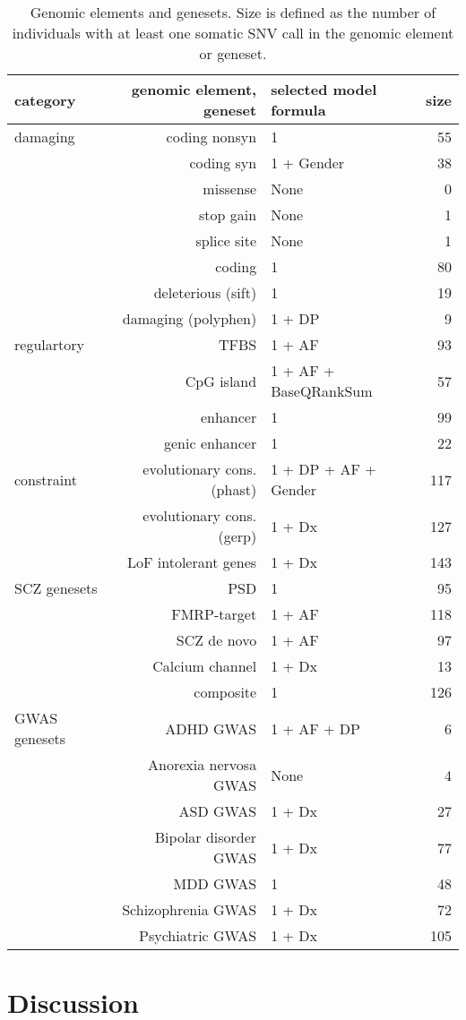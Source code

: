\documentclass[letterpaper]{article}
\begin{document}
\begin{table}
\begin{tabular}{lrlr}
category & genomic element, geneset & selected model formula & size \\
\hline
\hline
damaging & coding nonsyn & 1 & 55 \\
& coding syn & 1 + Gender & 38 \\
& missense & None & 0 \\
& stop gain & None & 1 \\
& splice site & None & 1 \\
& coding & 1 & 80 \\
& deleterious (sift) & 1 & 19 \\
& damaging (polyphen) & 1 + DP & 9 \\
\hline
regulartory & TFBS & 1 + AF & 93 \\
& CpG island & 1 + AF + BaseQRankSum & 57 \\
& enhancer & 1 & 99 \\
& genic enhancer & 1 & 22 \\
\hline
constraint & evolutionary cons. (phast) & 1 + DP + AF + Gender & 117 \\
& evolutionary cons. (gerp) & 1 + Dx & 127 \\
& LoF intolerant genes & 1 + Dx & 143 \\
\hline
SCZ genesets & PSD & 1 & 95 \\
& FMRP-target & 1 + AF & 118 \\
& SCZ de novo & 1 + AF & 97 \\
& Calcium channel & 1 + Dx & 13 \\
& composite & 1 & 126 \\
\hline
GWAS genesets & ADHD GWAS & 1 + AF + DP & 6 \\
& Anorexia nervosa GWAS & None & 4 \\
& ASD GWAS & 1 + Dx & 27 \\
& Bipolar disorder GWAS & 1 + Dx & 77 \\
& MDD GWAS & 1 & 48 \\
& Schizophrenia GWAS & 1 + Dx & 72 \\
& Psychiatric GWAS & 1 + Dx & 105 \\
\end{tabular}
\caption{Genomic elements and genesets.  Size is defined as the number of
	individuals with at least one somatic SNV call in the genomic element
	or geneset.}
\end{table}

\section*{Discussion}
\end{document}
